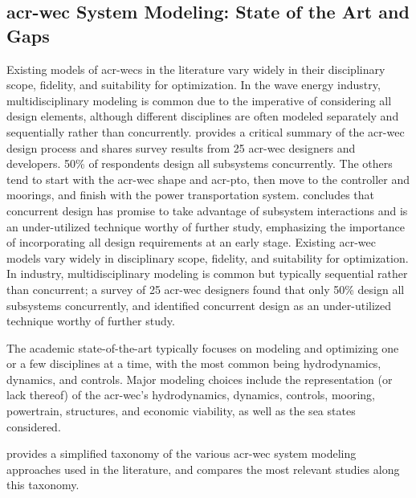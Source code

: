 \subsection{\gls{acr-wec} System Modeling: State of the Art and Gaps}
\label{sec:lit}
\ifdefined\DISSERTATION
    Existing models of \glspl{acr-wec} in the literature vary widely in their disciplinary scope, fidelity, and suitability for optimization.
    In the wave energy industry, multidisciplinary modeling is common due to the imperative of considering all design elements, although different disciplines are often modeled separately and sequentially rather than concurrently.
    \citet{trueworthy_wave_2020} provides a critical summary of the \gls{acr-wec} design process and shares survey results from 25 \gls{acr-wec} designers and developers.
    50\% of respondents design all subsystems concurrently.
    The others tend to start with the \gls{acr-wec} shape and \gls{acr-pto}, then move to the controller and moorings, and finish with the power transportation system.
    \citet{trueworthy_wave_2020} concludes that concurrent design has promise to take advantage of subsystem interactions and is an under-utilized technique worthy of further study, emphasizing the importance of incorporating all design requirements at an early stage.
\else
    Existing \gls{acr-wec} models vary widely in disciplinary scope, fidelity, and suitability for optimization.
In industry, multidisciplinary modeling is common but typically sequential rather than concurrent; a survey of 25 \gls{acr-wec} designers \citep{trueworthy_wave_2020} found that only 50\% design all subsystems concurrently, and identified concurrent design as an under-utilized technique worthy of further study.
\fi

The academic state-of-the-art typically focuses on modeling and optimizing one or a few disciplines at a time, with the most common being hydrodynamics, dynamics, and controls.
Major modeling choices include the representation (or lack thereof) of the \gls{acr-wec}'s hydrodynamics, dynamics, controls, mooring, powertrain, structures, and economic viability, as well as the sea states considered.

 provides a simplified taxonomy of the various \gls{acr-wec} system modeling approaches used in the literature,
and  compares the most relevant studies along this taxonomy.



